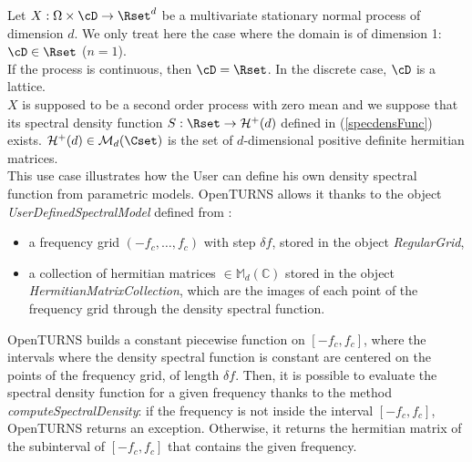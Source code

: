 \renewcommand{\filename}{docUC_StocProc_DensitySpectralFunction_UserDefined.tex}
\renewcommand{\filetitle}{UC : Creation of a User defined spectral density function}

\HeaderIIILevel

\label{SpectralModelCreation}

Let $X: \Omega \times \cD \rightarrow \Rset^d$  be a multivariate  stationary normal process of dimension $d$. We only treat here the case where the domain is of dimension 1: $\cD \in \Rset$ ($n=1$). \\
If the process is continuous, then $\cD=\Rset$. In the discrete case, $\cD$  is a lattice. \\


$X$ is supposed to be a second order process with zero mean and we suppose that its spectral density function $S : \Rset \rightarrow \mathcal{H}^+(d)$ defined in (\ref{specdensFunc}) exists. $\mathcal{H}^+(d) \in \mathcal{M}_d(\Cset)$ is the set of $d$-dimensional positive definite hermitian matrices.\\

This use case illustrates how the User can define his own density spectral function from parametric models. OpenTURNS allows it   thanks to the object {\itshape UserDefinedSpectralModel} defined from :
\begin{itemize}
\item a frequency grid $(-f_c, \dots, f_c)$ with step  $\delta f$, stored in the object \emph{RegularGrid},
\item a collection of hermitian matrices $\in \mathbb{M}_d(\mathbb{C})$ stored in the object \emph{HermitianMatrixCollection}, which are the images of each point of the frequency grid through the density spectral function.
\end{itemize}

OpenTURNS builds a constant piecewise function on  $[-f_c,f_c]$, where the intervals where the density spectral function is constant are centered on the points of the frequency grid, of length $ \delta f$. Then, it is  possible to evaluate the spectral density function for a given frequency thanks to the method {\itshape computeSpectralDensity}: if the frequency is not inside the interval  $[-f_c,f_c]$, OpenTURNS returns an exception. Otherwise, it returns the hermitian matrix of the subinterval of $[-f_c,f_c]$ that contains the given frequency.\\


